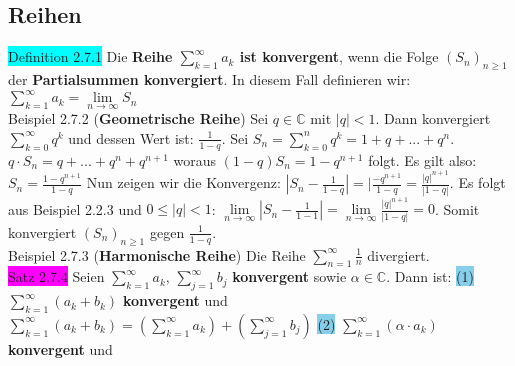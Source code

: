 \documentclass[landscape, 10pt]{article}
\newcommand{\C}{\mathbb{C}}
\begin{document}
\begin{multicols}{3}
       \subsection{Reihen}
              \colorbox{cyan}{Definition 2.7.1} Die \textbf{Reihe $\sum_{k=1}^\infty a_k$ ist konvergent}, 
                     wenn die Folge \textcolor{NavyBlue}{$(S_n)_{n\geqslant1}$} 
                     der \textbf{Partialsummen konvergiert}. In 
                     diesem Fall definieren wir: 
                     \textcolor{NavyBlue}{
                     $\sum_{k=1}^\infty a_k=\lim\limits_{n\to\infty}S_n$}\\
              \colorbox{Dandelion}{Beispiel 2.7.2} (\textbf{Geometrische Reihe}) Sei $q\in\C$ mit 
                     $|q|<1$. Dann konvergiert $\sum_{k=0}^\infty q^k$ und
                     dessen Wert ist: $\frac{1}{1-q}$. 
                     Sei $S_n=\sum_{k=0}^n q^k=1+q+...+q^n.$
                     $q\cdot S_n=q+...+q^n+q^{n+1}$ woraus
                     $(1-q)S_n=1-q^{n+1}$ folgt. Es gilt 
                     also: $S_n=\frac{1-q^{n+1}}{1-q}$
                     Nun zeigen wir die Konvergenz: 
                     $|S_n-\frac{1}{1-q}|=|\frac{-q^{n+1}}{1-q}
                     =\frac{|q|^{n+1}}{|1-q|}$. Es folgt aus
                     Beispiel 2.2.3 
                     und $0\leqslant|q|<1$:
                     $\lim\limits_{n\to\infty}|S_n-\frac{1}{1-1}|
                     =\lim\limits_{n\to\infty}\frac{|q|^{n+1}}{|1-q|}=0$.
                     Somit konvergiert $(S_n)_{n\geqslant1}$ gegen
                     $\frac{1}{1-q}$.\\
              \colorbox{Dandelion}{Beispiel 2.7.3} (\textbf{Harmonische Reihe}) Die Reihe
                     $\sum_{n=1}^\infty\frac{1}{n}$ divergiert.\\
              \colorbox{magenta}{Satz 2.7.4} Seien 
                     \textcolor{NavyBlue}{$\sum_{k=1}^\infty a_k,\,\sum_{j=1}^\infty b_j$} 
                     \textbf{konvergent} sowie \textcolor{NavyBlue}{$\alpha\in\C$}. 
                     Dann ist:
                     \colorbox{SkyBlue}{(1)} 
                     \textcolor{NavyBlue}{$\sum_{k=1}^\infty(a_k+b_k)$} 
                     \textbf{konvergent} und 
                     \textcolor{NavyBlue}{
                     $\sum_{k=1}^\infty(a_k+b_k
                     )=(\sum_{k=1}^\infty a_k)+(\sum_{j=1}^\infty b_j)$}
                     \colorbox{SkyBlue}{(2)} 
                     \textcolor{NavyBlue}{$\sum_{k=1}^\infty(\alpha\cdot a_k)$} 
                     \textbf{konvergent} und 

\end{multicols}
\end{document}
